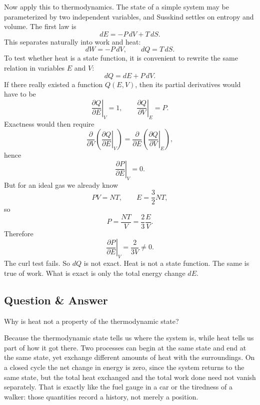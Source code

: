 Now apply this to thermodynamics. The state of a simple system may be parameterized by two independent variables, and Susskind settles on entropy and volume. The first law is
\begin{equation}
dE=-P\,dV+T\,dS.
\end{equation}
This separates naturally into work and heat:
\begin{equation}
dW=-P\,dV,
\qquad
dQ=T\,dS.
\end{equation}
To test whether heat is a state function, it is convenient to rewrite the same relation in variables \(E\) and \(V\):
\begin{equation}
dQ=dE+P\,dV.
\end{equation}
If there really existed a function \(Q(E,V)\), then its partial derivatives would have to be
\begin{equation}
\left.\frac{\partial Q}{\partial E}\right|_V=1,
\qquad
\left.\frac{\partial Q}{\partial V}\right|_E=P.
\end{equation}
Exactness would then require
\begin{equation}
\frac{\partial}{\partial V}\left(\left.\frac{\partial Q}{\partial E}\right|_V\right)
=
\frac{\partial}{\partial E}\left(\left.\frac{\partial Q}{\partial V}\right|_E\right),
\end{equation}
hence
\begin{equation}
\left.\frac{\partial P}{\partial E}\right|_V=0.
\end{equation}
But for an ideal gas we already know
\begin{equation}
PV=NT,
\qquad
E=\frac{3}{2}NT,
\end{equation}
so
\begin{equation}
P=\frac{NT}{V}=\frac{2}{3}\frac{E}{V}.
\end{equation}
Therefore
\begin{equation}
\left.\frac{\partial P}{\partial E}\right|_V=\frac{2}{3V}\neq 0.
\end{equation}
The curl test fails. So \(dQ\) is not exact. Heat is not a state function. The same is true of work. What is exact is only the total energy change \(dE\).

\subsection{Question \& Answer}

Why is heat not a property of the thermodynamic state?

Because the thermodynamic state tells us where the system is, while heat tells us part of how it got there. Two processes can begin at the same state and end at the same state, yet exchange different amounts of heat with the surroundings. On a closed cycle the net change in energy is zero, since the system returns to the same state, but the total heat exchanged and the total work done need not vanish separately. That is exactly like the fuel gauge in a car or the tiredness of a walker: those quantities record a history, not merely a position.

